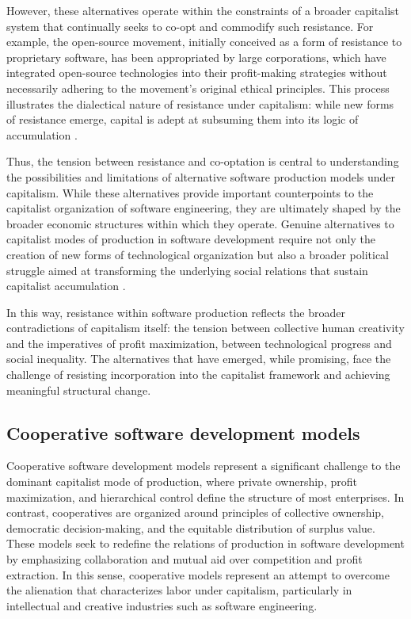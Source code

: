 However, these alternatives operate within the constraints of a broader capitalist system that continually seeks to co-opt and commodify such resistance. For example, the open-source movement, initially conceived as a form of resistance to proprietary software, has been appropriated by large corporations, which have integrated open-source technologies into their profit-making strategies without necessarily adhering to the movement's original ethical principles. This process illustrates the dialectical nature of resistance under capitalism: while new forms of resistance emerge, capital is adept at subsuming them into its logic of accumulation \cite[pp.~152-154]{berardi2012}.

Thus, the tension between resistance and co-optation is central to understanding the possibilities and limitations of alternative software production models under capitalism. While these alternatives provide important counterpoints to the capitalist organization of software engineering, they are ultimately shaped by the broader economic structures within which they operate. Genuine alternatives to capitalist modes of production in software development require not only the creation of new forms of technological organization but also a broader political struggle aimed at transforming the underlying social relations that sustain capitalist accumulation \cite[pp.~32-34]{fuchs2015}.

In this way, resistance within software production reflects the broader contradictions of capitalism itself: the tension between collective human creativity and the imperatives of profit maximization, between technological progress and social inequality. The alternatives that have emerged, while promising, face the challenge of resisting incorporation into the capitalist framework and achieving meaningful structural change.

\subsection{Cooperative software development models}

Cooperative software development models represent a significant challenge to the dominant capitalist mode of production, where private ownership, profit maximization, and hierarchical control define the structure of most enterprises. In contrast, cooperatives are organized around principles of collective ownership, democratic decision-making, and the equitable distribution of surplus value. These models seek to redefine the relations of production in software development by emphasizing collaboration and mutual aid over competition and profit extraction. In this sense, cooperative models represent an attempt to overcome the alienation that characterizes labor under capitalism, particularly in intellectual and creative industries such as software engineering.

